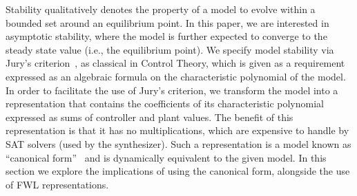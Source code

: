 \documentclass[sigconf]{llncs}
\begin{document}
Stability qualitatively denotes the property of a model to evolve within a
bounded set around an equilibrium point.  In this paper, we are interested
in asymptotic stability, where the model is further expected to converge to
the steady state value (i.e., the equilibrium point).
%
We specify model stability via Jury's criterion~\cite{fadali}, 
as classical in Control Theory,  %
which is given as a requirement expressed as an algebraic formula on the
characteristic polynomial of the model.  In order to facilitate the use of
Jury's criterion, we transform the model into a representation that contains
the coefficients of its characteristic polynomial expressed as sums of
controller and plant values.  The benefit of this representation is that it
has no multiplications, which are expensive to handle by SAT solvers (used
by the synthesizer).
%
Such a representation is a model known as 
``canonical form''~\cite{Astrom08} %
and is dynamically equivalent to the given model.  
In this section we explore the implications of using the canonical form, 
alongside the use of FWL representations.  

\medskip
\end{document}
